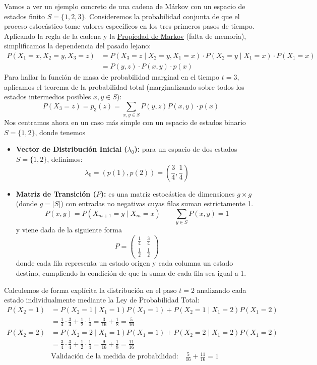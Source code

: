 \begin{ejemplo}
    Vamos a ver un ejemplo concreto de una cadena de Márkov con un espacio de estados finito $S = \{1, 2, 3\}$. Consideremos la probabilidad conjunta de que el proceso estocástico tome valores específicos en los tres primeros pasos de tiempo. Aplicando la regla de la cadena y la \underline{Propiedad de Markov} (falta de memoria), simplificamos la dependencia del pasado lejano:
    \begin{align*}
        P(X_1 = x, X_2 = y, X_3 = z) &= P(X_3 = z \mid X_2 = y, X_1 = x) \cdot P(X_2 = y \mid X_1 = x) \cdot P(X_1 = x) \\
        &= P(y, z) \cdot P(x, y) \cdot p(x)
    \end{align*}
    Para hallar la función de masa de probabilidad marginal en el tiempo $t=3$, aplicamos el teorema de la probabilidad total (marginalizando sobre todos los estados intermedios posibles $x, y \in S$):
    \[
    P(X_3 = z) = p_3(z) = \sum_{x, y \in S} P(y, z) P(x, y) \cdot p(x)
    \]
    Nos centramos ahora en un caso más simple con un espacio de estados binario $S = \{1, 2\}$, donde tenemos 
    \begin{itemize}
        \item  \textbf{Vector de Distribución Inicial ($\lambda_0$):} para un espacio de dos estados $S = \{1, 2\}$, definimos:
        \[ \lambda_0 = (p(1), p(2)) = \left( \frac{3}{4}, \frac{1}{4} \right) \]
        
        \item \textbf{Matriz de Transición ($P$):} es una matriz estocástica de dimensiones $g \times g$ (donde $g = |S|$) con entradas no negativas cuyas filas suman estrictamente 1.
        \[ P(x, y) = P(X_{m+1} = y \mid X_m = x) \qquad \sum_{y \in S} P(x, y) = 1 \]
        y viene dada de la siguiente forma
        \[ P = \begin{pmatrix} \frac{1}{4} & \frac{3}{4} \\[0.2cm] \frac{1}{2} & \frac{1}{2} \end{pmatrix} \]
        donde cada fila representa un estado origen y cada columna un estado destino, cumpliendo la condición de que la suma de cada fila sea igual a 1.
    \end{itemize}
    Calculemos de forma explícita la distribución en el paso $t=2$ analizando cada estado individualmente mediante la Ley de Probabilidad Total:
    \begin{align*}
    P(X_2 = 1) &= P(X_2 = 1 \mid X_1 = 1)P(X_1 = 1) + P(X_2 = 1 \mid X_1 = 2)P(X_1 = 2) \\
    &= \frac{1}{4} \cdot \frac{3}{4} + \frac{1}{2} \cdot \frac{1}{4} = \frac{3}{16} + \frac{1}{8} = \frac{5}{16} \\[0.3cm]
    P(X_2 = 2) &= P(X_2 = 2 \mid X_1 = 1)P(X_1 = 1) + P(X_2 = 2 \mid X_1 = 2)P(X_1 = 2) \\
    &= \frac{3}{4} \cdot \frac{3}{4} + \frac{1}{2} \cdot \frac{1}{4} = \frac{9}{16} + \frac{1}{8} = \frac{11}{16} \\
    &\text{Validación de la medida de probabilidad:} \quad \frac{5}{16} + \frac{11}{16} = 1
    \end{align*}


\end{ejemplo}
